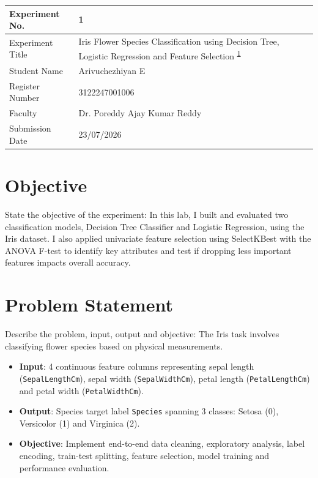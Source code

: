 \documentclass[12pt,a4paper]{article}
\begin{document}

\begin{tabular}{|p{4cm}|p{11cm}|}
\hline
Experiment No. & 1 \\ \hline
Experiment Title & Iris Flower Species Classification using Decision Tree, Logistic Regression and Feature Selection \textsuperscript{\href{https://github.com/arivuchezhiyan/Machine_Learning}{1}} \\ \hline
Student Name & Arivuchezhiyan E \\ \hline
Register Number & 3122247001006 \\ \hline
Faculty & Dr. Poreddy Ajay Kumar Reddy \\ \hline
Submission Date & 23/07/2026 \\ \hline
\end{tabular}

\section{Objective}
State the objective of the experiment:
In this lab, I built and evaluated two classification models, Decision Tree Classifier and Logistic Regression, using the Iris dataset. I also applied univariate feature selection using SelectKBest with the ANOVA F-test to identify key attributes and test if dropping less important features impacts overall accuracy.

\section{Problem Statement}
Describe the problem, input, output and objective:
The Iris task involves classifying flower species based on physical measurements.
\begin{itemize}
\item \textbf{Input}: 4 continuous feature columns representing sepal length (\texttt{SepalLengthCm}), sepal width (\texttt{SepalWidthCm}), petal length (\texttt{PetalLengthCm}) and petal width (\texttt{PetalWidthCm}).
\item \textbf{Output}: Species target label \texttt{Species} spanning 3 classes: Setosa (0), Versicolor (1) and Virginica (2).
\item \textbf{Objective}: Implement end-to-end data cleaning, exploratory analysis, label encoding, train-test splitting, feature selection, model training and performance evaluation.
\end{itemize}
\end{document}
